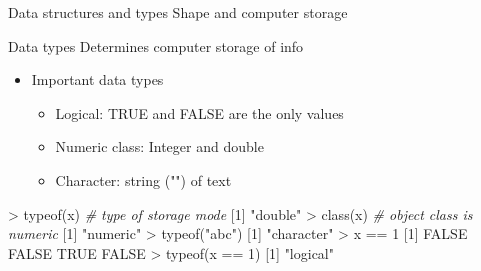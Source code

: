 \documentclass[
  ignorenonframetext,
]{beamer}
\newenvironment{Shaded}{\begin{snugshade}}{\end{snugshade}}
\newcommand{\CommentTok}[1]{\textcolor[rgb]{0.56,0.35,0.01}{\textit{#1}}}
\newcommand{\ConstantTok}[1]{\textcolor[rgb]{0.00,0.00,0.00}{#1}}
\newcommand{\DecValTok}[1]{\textcolor[rgb]{0.00,0.00,0.81}{#1}}
\newcommand{\FunctionTok}[1]{\textcolor[rgb]{0.00,0.00,0.00}{#1}}
\newcommand{\NormalTok}[1]{#1}
\newcommand{\SpecialCharTok}[1]{\textcolor[rgb]{0.00,0.00,0.00}{#1}}
\newcommand{\StringTok}[1]{\textcolor[rgb]{0.31,0.60,0.02}{#1}}
\providecommand{\tightlist}{%
  \setlength{\itemsep}{0pt}\setlength{\parskip}{0pt}}
\begin{document}
\begin{frame}{Data structures and types \textbar{} Shape and computer
storage}
\protect\hypertarget{data-structures-and-types-shape-and-computer-storage}{}
\end{frame}

\begin{frame}[fragile]{Data types \textbar{} Determines computer storage
of info}
\protect\hypertarget{data-types-determines-computer-storage-of-info}{}
\begin{itemize}[<+->]
\tightlist
\item
  Important data types

  \begin{itemize}[<+->]
  \tightlist
  \item
    Logical: TRUE and FALSE are the only values
  \item
    Numeric class: Integer and double
  \item
    Character: string ("") of text
  \end{itemize}
\end{itemize}

\begin{Shaded}
\begin{Highlighting}[]
\SpecialCharTok{\textgreater{}} \FunctionTok{typeof}\NormalTok{(x)  }\CommentTok{\# type of storage mode }
\NormalTok{[}\DecValTok{1}\NormalTok{] }\StringTok{"double"}
\SpecialCharTok{\textgreater{}} \FunctionTok{class}\NormalTok{(x)   }\CommentTok{\# object class is numeric}
\NormalTok{[}\DecValTok{1}\NormalTok{] }\StringTok{"numeric"}
\SpecialCharTok{\textgreater{}} \FunctionTok{typeof}\NormalTok{(}\StringTok{"abc"}\NormalTok{)}
\NormalTok{[}\DecValTok{1}\NormalTok{] }\StringTok{"character"}
\SpecialCharTok{\textgreater{}}\NormalTok{ x }\SpecialCharTok{==} \DecValTok{1}
\NormalTok{[}\DecValTok{1}\NormalTok{] }\ConstantTok{FALSE} \ConstantTok{FALSE}  \ConstantTok{TRUE} \ConstantTok{FALSE}
\SpecialCharTok{\textgreater{}} \FunctionTok{typeof}\NormalTok{(x }\SpecialCharTok{==} \DecValTok{1}\NormalTok{)}
\NormalTok{[}\DecValTok{1}\NormalTok{] }\StringTok{"logical"}
\end{Highlighting}
\end{Shaded}
\end{frame}
\end{document}
